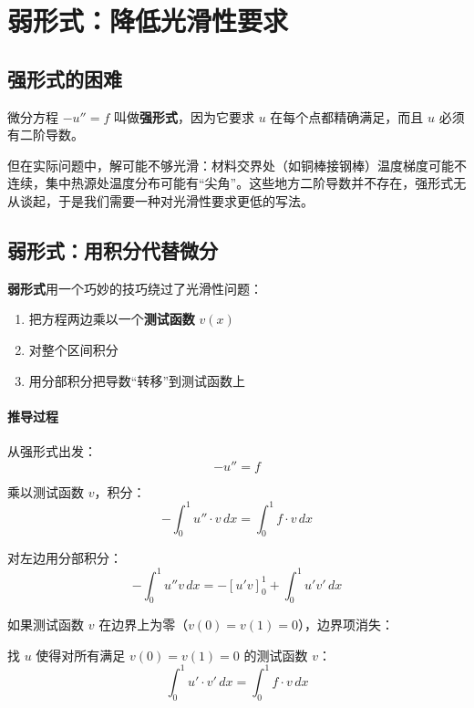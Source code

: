 \section{弱形式：降低光滑性要求}

\subsection{强形式的困难}

微分方程 $-u'' = f$ 叫做\textbf{强形式}，因为它要求 $u$ 在每个点都精确满足，而且 $u$ 必须有二阶导数。

但在实际问题中，解可能不够光滑：材料交界处（如铜棒接钢棒）温度梯度可能不连续，集中热源处温度分布可能有“尖角”。这些地方二阶导数并不存在，强形式无从谈起，于是我们需要一种对光滑性要求更低的写法。

\subsection{弱形式：用积分代替微分}

\textbf{弱形式}用一个巧妙的技巧绕过了光滑性问题：

\begin{enumerate}
    \item 把方程两边乘以一个\textbf{测试函数} $v(x)$
    \item 对整个区间积分
    \item 用分部积分把导数“转移”到测试函数上
\end{enumerate}

\paragraph{推导过程}

从强形式出发：
\[
-u'' = f
\]

乘以测试函数 $v$，积分：
\[
-\int_0^1 u'' \cdot v \, dx = \int_0^1 f \cdot v \, dx
\]

对左边用分部积分：
\[
-\int_0^1 u'' v \, dx = -[u' v]_0^1 + \int_0^1 u' v' \, dx
\]

如果测试函数 $v$ 在边界上为零（$v(0) = v(1) = 0$），边界项消失：

\begin{keyformula}[title=弱形式]
找 $u$ 使得对所有满足 $v(0) = v(1) = 0$ 的测试函数 $v$：
\begin{equation}
\boxed{\int_0^1 u' \cdot v' \, dx = \int_0^1 f \cdot v \, dx}
\end{equation}
\end{keyformula}

